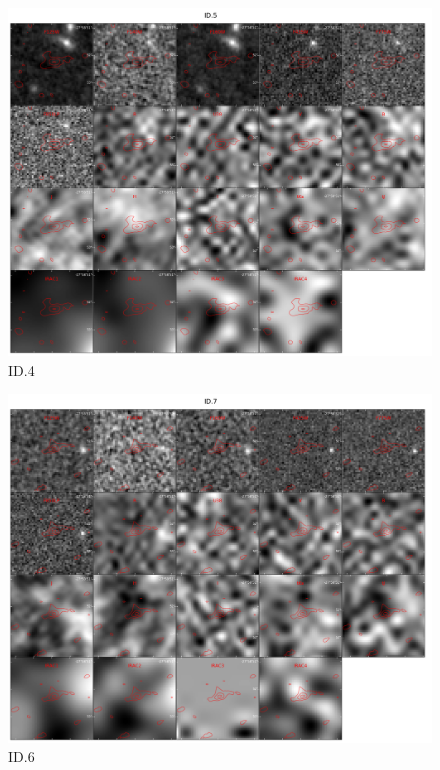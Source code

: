 \begin{figure}[tbp]
\centering \includegraphics[width=120mm]{Matched/ASPECS_Cutout_4.jpg}
\caption{ID.4}
\label{fig:Match_Three}
\end{figure}

\begin{figure}[tbp]
\centering \includegraphics[width=120mm]{Matched/ASPECS_Cutout_6.jpg}
\caption{ID.6}
\label{fig:Match_Three}
\end{figure}

